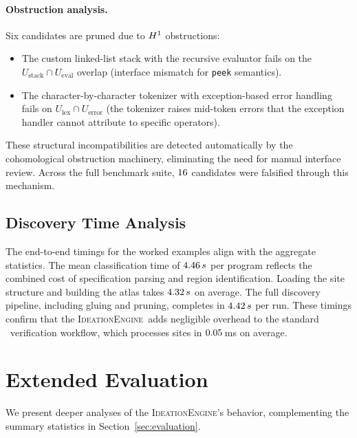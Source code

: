 \documentclass[11pt]{article}
\newcommand{\IdeationEngine}{\textsc{IdeationEngine}}
\begin{document}
\paragraph{Obstruction analysis.}
Six candidates are pruned due to $H^{1}$ obstructions:
\begin{itemize}[noitemsep]
  \item The custom linked-list stack with the recursive evaluator
        fails on the $U_{\text{stack}} \cap U_{\text{eval}}$ overlap
        (interface mismatch for \texttt{peek} semantics).
  \item The character-by-character tokenizer with exception-based
        error handling fails on $U_{\text{lex}} \cap U_{\text{error}}$
        (the tokenizer raises mid-token errors that the exception
        handler cannot attribute to specific operators).
\end{itemize}

These structural incompatibilities are detected automatically by the
cohomological obstruction machinery, eliminating the need for manual
interface review.  Across the full benchmark suite, $16$
candidates were falsified through this mechanism.

\subsection{Discovery Time Analysis}

The end-to-end timings for the worked examples align with the
aggregate statistics.  The mean classification time of
$4.46\,s$ per program reflects the combined cost of
specification parsing and region identification.  Loading the
site structure and building the atlas takes $4.32\,s$
on average.  The full discovery pipeline, including gluing and
pruning, completes in $4.42\,s$ per run.  These
timings confirm that the \IdeationEngine\ adds negligible overhead
to the standard \JuGeo\ verification workflow, which processes sites
in $0.05$\,ms on average.

\section{Extended Evaluation}\label{sec:extended-eval}

We present deeper analyses of the \IdeationEngine's behavior,
complementing the summary statistics in Section~\ref{sec:evaluation}.
\end{document}
